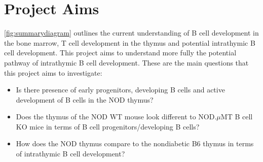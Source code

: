 \section{Project Aims}

\cref{fig:summarydiagram} outlines the current understanding of B cell development in the bone marrow, T cell development in the thymus and potential intrathymic B cell development.
This project aims to understand more fully the potential pathway of intrathymic B cell development.
These are the main questions that this project aims to investigate:
\begin{itemize}
\item Is there presence of early progenitors, developing B cells and active development of B cells in the NOD thymus?
\item Does the thymus of the NOD WT mouse look different to NOD.$\mu$MT B cell KO mice in terms of B cell progenitors/developing B cells?
\item How does the NOD thymus compare to the nondiabetic B6 thymus in terms of intrathymic B cell development?
\end{itemize}

